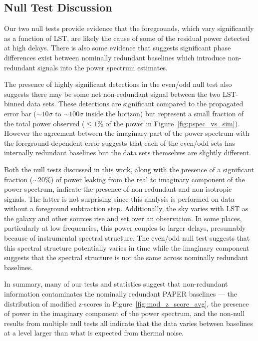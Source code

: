 \subsection{Null Test Discussion}

Our two null tests provide evidence that the foregrounds,
which vary significantly as a function of LST, are likely the cause of
some of the residual power detected at high delays. There is also some
evidence that suggests significant phase differences exist between
nominally redundant baselines which introduce non-redundant signals
into the power spectrum estimates.

The presence of highly significant detections in the
even/odd null test also suggests
there may be some net non-redundant signal between the
two LST-binned data sets. These detections are significant
compared to the propagated error bar ($ \sim10\sigma $ to $ \sim100\sigma $ inside the horizon) but
represent a small fraction of the total power observed ($ \leq 1\% $ of the power in Figure~\ref{fig:pspec_vs_sim}).
However the agreement between the
imaginary part of the power spectrum with the
foreground-dependent error suggests that each of the even/odd sets
has internally redundant baselines but the
data sets themselves are slightly different.

Both the null tests discussed in this work, along with the
presence of a significant fraction ($ \sim20\% $)
of power leaking from the real to imaginary component of
the power spectrum, indicate the presence of
non-redundant and non-isotropic signals. The latter
is not surprising since this analysis is performed
on data without a foreground subtraction step. Additionally, the sky
varies with LST as the galaxy and other sources
rise and set over an observation. In some places, particularly at low frequencies, this power
couples to larger delays, presumably because of
instrumental spectral structure. The even/odd null test suggests that this
spectral structure potentially varies in time while the imaginary component
suggests that the spectral structure is not the same across nominally redundant baselines.

In summary, many of our tests and statistics suggest that non-redundant
information contaminates the nominally redundant PAPER
baselines --- the distribution of modified z-scores in
Figure~\ref{fig:mod_z_score_avg}, the presence
of power in the imaginary component of the power
spectrum, and the non-null results from multiple null tests all indicate that the
data varies between baselines at a level larger
than what is expected from thermal noise.

